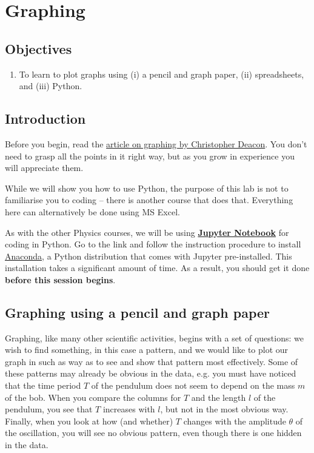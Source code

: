 \chapter{Graphing}
\section{Objectives}

\begin{enumerate}
    \item To learn to plot graphs using (i) a pencil and graph paper, (ii) spreadsheets, and (iii) Python.
\end{enumerate}

\section{Introduction}

Before you begin, read the \href{https://www.physics.mun.ca/~cdeacon/publications/graphs_tpt.pdf}{article on graphing by Christopher Deacon}. You don't need to grasp all the points in it right way, but as you grow in experience you will appreciate them.

While we will show you how to use Python, the purpose of this lab is not to familiarise you to coding -- there is another course that does that. Everything here can alternatively be done using MS Excel.

\begin{imp}
As with the other Physics courses, we will be using \textbf{\href{https://jupyter.org}{Jupyter Notebook}} for coding in Python.  Go to the link and follow the instruction procedure to install \href{https://www.anaconda.com/downloads}{Anaconda}, a Python distribution that comes with Jupyter pre-installed. This installation takes a significant amount of time. As a result, you should get it done \textbf{before this session begins}. 
\end{imp}

\section{Graphing using a pencil and graph paper}
Graphing, like many other scientific activities, begins with a set of questions: we wish to find something, in this case a pattern, and we would like to plot our graph in such as way as to see and show that pattern most effectively. Some of these patterns may already be obvious in the data, e.g. you must have noticed that the time period $T$ of the pendulum does not seem to depend on the mass $m$ of the bob. When you compare the columns for $T$ and the length $l$ of the pendulum, you see that $T$ increases with $l$, but not in the most obvious way. Finally, when you look at how (and whether) $T$ changes with the amplitude $\theta$ of the oscillation, you will see no obvious pattern, even though there is one hidden in the data. 

